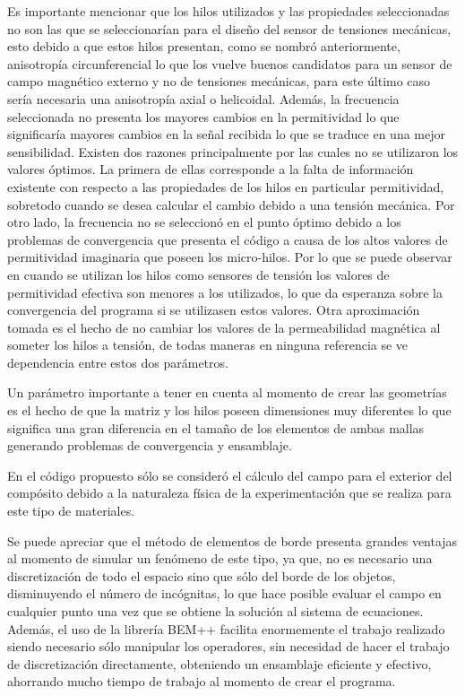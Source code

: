 \documentclass[12pt,letterpaper]{article}
\numberwithin{equation}{section}
\begin{document}
Es importante mencionar que los hilos utilizados y las propiedades seleccionadas no son las que se seleccionarían para el diseño del sensor de tensiones mecánicas, esto debido a que estos hilos presentan, como se nombró anteriormente, anisotropía circunferencial lo que los vuelve buenos candidatos para un sensor de campo magnético externo y no de tensiones mecánicas, para este último caso sería necesaria una anisotropía axial o helicoidal. Además, la frecuencia seleccionada no presenta los mayores cambios en la permitividad lo que significaría mayores cambios en la señal recibida lo que se traduce en una mejor sensibilidad. Existen dos razones principalmente por las cuales no se utilizaron los valores óptimos. La primera de ellas corresponde a la falta de información existente con respecto a las propiedades de los hilos en particular permitividad, sobretodo cuando se desea calcular el cambio debido a una tensión mecánica. Por otro lado, la frecuencia no se seleccionó en el punto óptimo debido a los problemas de convergencia que presenta el código a causa de los altos valores de permitividad imaginaria que poseen los micro-hilos. Por lo que se puede observar en \cite{Wire_backgound} cuando se utilizan los hilos como sensores de tensión los valores de permitividad efectiva son menores a los utilizados, lo que da esperanza sobre la convergencia del programa si se utilizasen estos valores. Otra aproximación tomada es el hecho de no cambiar los valores de la permeabilidad magnética al someter los hilos a tensión, de todas maneras en ninguna referencia se ve dependencia entre estos dos parámetros. 

Un parámetro importante a tener en cuenta al momento de crear las geometrías es el hecho de que la matriz y los hilos poseen dimensiones muy diferentes lo que significa una gran diferencia en el tamaño de los elementos de ambas mallas generando problemas de convergencia y ensamblaje. 

En el código propuesto sólo se consideró el cálculo del campo para el exterior del compósito debido a la naturaleza física de la experimentación que se realiza para este tipo de materiales.

Se puede apreciar que el método de elementos de borde presenta grandes ventajas al momento de simular un fenómeno de este tipo, ya que, no es necesario una discretización de todo el espacio sino que sólo del borde de los objetos, disminuyendo el número de incógnitas, lo que hace posible evaluar el campo en cualquier punto una vez que se obtiene la solución al sistema de ecuaciones. Además, el uso de la librería BEM++ facilita enormemente el trabajo realizado siendo necesario sólo manipular los operadores, sin necesidad de hacer el trabajo de discretización directamente, obteniendo un ensamblaje eficiente y efectivo, ahorrando mucho tiempo de trabajo al momento de crear el programa.
\end{document}
